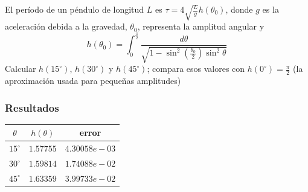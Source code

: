 \begin{frame}
El período de un péndulo de longitud $L$ es $\tau = 4 \sqrt{\frac{L}{g}} h(\theta_{0})$, donde $g$ es la aceleración debida a la gravedad, $\theta_{0}$, representa la amplitud angular y 
\[ h(\theta_{0}) =  \int_{0}^{\frac{\pi}{2}} \dfrac{d\theta}{\sqrt{1 - \sin^{2} \left( \frac{\theta_{0}}{2}\right) \sin^{2} \theta}} \]
Calcular $h(15^{\circ})$, $h(30^{\circ})$ y $h(45^{\circ})$; compara esos valores con $h(0^{\circ}) = \frac{\pi}{2}$ (la aproximación usada para pequeñas amplitudes)
\end{frame}
\begin{frame}
\frametitle{Resultados}
\begin{center}
\begin{tabular}{c | c | c}
$\theta$ & $h(\theta)$  & error \\ \hline
$15^{\circ}$ & $1.57755$ & $4.30058e-03$ \\ \hline
$30^{\circ}$ & $1.59814$ & $1.74088e-02$ \\ \hline
$45^{\circ}$ & $1.63359$ & $3.99733e-02$ 
\end{tabular}
\end{center}
\end{frame}
